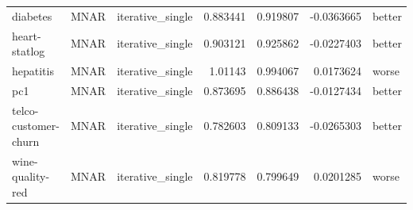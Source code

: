 \begin{table}[ht]
\begin{tabular}{lllrrrl}
 diabetes             & MNAR        & iterative\_single &                                 0.883441 &                             0.919807 &                    -0.0363665  & better               \\
 heart-statlog        & MNAR        & iterative\_single &                                 0.903121 &                             0.925862 &                    -0.0227403  & better               \\
 hepatitis            & MNAR        & iterative\_single &                                 1.01143  &                             0.994067 &                     0.0173624  & worse                \\
 pc1                  & MNAR        & iterative\_single &                                 0.873695 &                             0.886438 &                    -0.0127434  & better               \\
 telco-customer-churn & MNAR        & iterative\_single &                                 0.782603 &                             0.809133 &                    -0.0265303  & better               \\
 wine-quality-red     & MNAR        & iterative\_single &                                 0.819778 &                             0.799649 &                     0.0201285  & worse                \\
\hline
\end{tabular}
\end{table}
